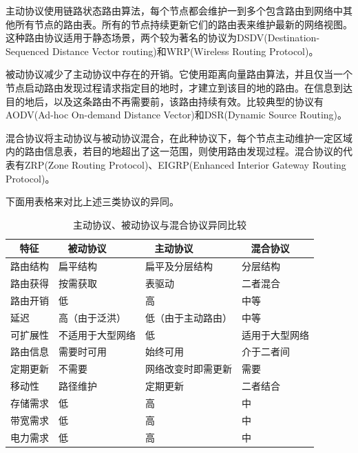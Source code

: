 \documentclass[12pt,a4paper]{article}
\begin{document}
主动协议\cite{Alslaim2014}使用链路状态路由算法，每个节点都会维护一到多个包含路由到网络中其他所有节点的路由表。所有的节点持续更新它们的路由表来维护最新的网络视图。这种路由协议适用于静态场景，两个较为著名的协议为DSDV(Destination-Sequenced Distance Vector routing)和WRP(Wireless Routing Protocol)\cite{Murthy1996}。

被动协议减少了主动协议中存在的开销。它使用距离向量路由算法，并且仅当一个节点启动路由发现过程请求指定目的地时，才建立到该目的地的路由。在信息到达目的地后，以及这条路由不再需要前，该路由持续有效。比较典型的协议有AODV(Ad-hoc On-demand Distance Vector)和DSR(Dynamic Source Routing)\cite{Johnson, Perkins1999}。

混合协议将主动协议与被动协议混合，在此种协议下，每个节点主动维护一定区域内的路由信息表，若目的地超出了这一范围，则使用路由发现过程。混合协议的代表有ZRP(Zone Routing Protocol)、EIGRP(Enhanced Interior Gateway Routing Protocol)。

下面用表格来对比上述三类协议的异同。

\begin{table}[htb]
\renewcommand\arraystretch{1.2}
\caption{主动协议、被动协议与混合协议异同比较}
\centering
\begin{tabular}{l l l l}
\\
\hline
\hline
~ \textbf{特征} ~ & ~ \textbf{被动协议} ~ & ~ \textbf{主动协议} ~ & ~ \textbf{混合协议} \\[6pt]
\hline
路由结构  & 扁平结构 & 扁平及分层结构 & 分层结构 \\[6pt]
\hline
路由获得 & 按需获取 & 表驱动 & 二者混合
\\[6pt]
\hline
路由开销 & 低 & 高 & 中等
\\[6pt]
\hline
延迟 & 高（由于泛洪） & 低（由于主动路由） & 中等
\\[6pt]
\hline
可扩展性 & 不适用于大型网络 & 低 & 适用于大型网络
\\[6pt]
\hline
路由信息 & 需要时可用 & 始终可用 & 介于二者间
\\[6pt]
\hline
定期更新 & 不需要 & 网络改变时即需更新 & 需要
\\[6pt]
\hline
移动性 & 路径维护 & 定期更新 & 二者结合
\\[6pt]
\hline
存储需求 & 低 & 高 & 中
\\[6pt]
\hline
带宽需求 & 低 & 高 & 中
\\[6pt]
\hline
电力需求 & 低 & 高 & 中
\\[6pt]
\hline
\hline
\end{tabular}
\end{table}
\end{document}
